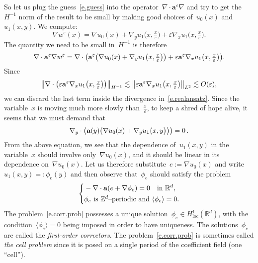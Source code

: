 \documentclass[11pt,twoside]{article} %
\numberwithin{equation}{section}
\theoremstyle{definition}
\let\originalleft\left
\let\originalright\right
\renewcommand{\left}{\mathopen{}\mathclose\bgroup\originalleft}
\renewcommand{\right}{\aftergroup\egroup\originalright}
\newcommand*{\Z}{\ensuremath{\mathbb{Z}}}
\newcommand*{\R}{\ensuremath{\mathbb{R}}}
\newcommand*{\Rd}{\ensuremath{\mathbb{R}^d}}
\newcommand{\eps}{\varepsilon}
\newcommand{\ep}{\eps}
\renewcommand{\a}{\mathbf{a}}
\begin{document}
\smallskip

So let us plug the guess~\eqref{e.guess} into the operator~$\nabla \cdot \a^\ep\nabla$ and try to get the~$H^{-1}$ norm of the result to be small by making good choices of~$u_0(x)$ and~$u_1(x,y)$. We compute:
\begin{equation}
\nabla w^\ep(x) = 
\nabla u_0(x) 
+ \nabla_y u_1\bigl(x,\tfrac x\ep \bigr)
+ \ep \nabla_xu_1\bigl(x,\tfrac x\ep \bigr).
\end{equation}
The quantity we need to be small in~$H^{-1}$ is therefore
\begin{equation}
\label{e.realansatz}
\nabla \cdot \a^\ep \nabla w^\ep 
=
\nabla \cdot \left( 
\a^\ep \left( 
\nabla u_0(x) 
+ \nabla_y u_1\bigl(x,\tfrac x\ep \bigr)
\right)
+ \ep \a^\ep \nabla_xu_1\bigl(x,\tfrac x\ep \bigr)
\right).
\end{equation}
Since
\begin{equation}
\label{e.Oeps}
\left\| \nabla \cdot \left( \ep \a^\ep \nabla_xu_1\bigl(x,\tfrac x\ep \bigr)
\right) \right\|_{H^{-1}} 
\lesssim
\left\|  \ep \a^\ep \nabla_xu_1\bigl(x,\tfrac x\ep \bigr)
\right\|_{L^2} 
\lesssim O(\ep), 
\end{equation}
we can discard the last term inside the divergence in~\eqref{e.realansatz}. 
Since the variable~$x$ is moving much more slowly than~$\frac x\ep$, to keep a shred of hope alive, it seems that we must demand that
\begin{equation}
\nabla_y \cdot 
\left( 
\a(y) \left( 
\nabla u_0(x) 
+ \nabla_y u_1\bigl(x,y \bigr)
\right)\right)
= 0 \,. 
\end{equation}
From the above equation, we see that the dependence of~$u_1(x,y)$ in the variable~$x$ should involve only~$\nabla u_0(x)$, and it should be linear in its dependence on~$\nabla u_0(x)$. Let us therefore substitute~$e:= \nabla u_0(x)$ and write~$u_1(x,y) =: \phi_e(y)$ and then observe that~$\phi_e$ should satisfy the problem
\begin{equation}
\label{e.corr.prob}
\left\{
\begin{aligned}
&-\nabla \cdot \a \left( e + \nabla \phi_e  \right) = 0 \quad \mbox{in}  \ \R^d, \\
& \phi_e  \ \mbox{is~$\Z^d$--periodic and} \ \langle \phi_e  \rangle = 0. 
\end{aligned}
\right.
\end{equation}
The problem~\eqref{e.corr.prob} possesses a unique solution~$\phi_e\in H^1_{\mathrm{loc}}(\Rd)$, with the condition~$\langle \phi_e  \rangle = 0$ being imposed in order to have uniqueness. The solutions~$\phi_e$ are called the \emph{first-order correctors}. The problem~\eqref{e.corr.prob} is sometimes called \emph{the cell problem} since it is posed on a single period of the coefficient field (one  ``cell'').
\end{document}
